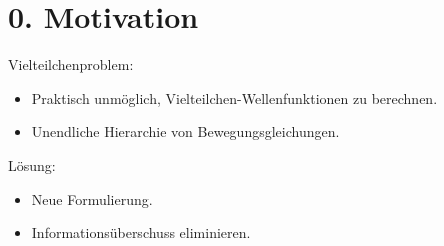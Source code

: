 \section*{0. Motivation}

Vielteilchenproblem:
\begin{itemize}
    \item Praktisch unmöglich, Vielteilchen-Wellenfunktionen zu berechnen.
    \item Unendliche Hierarchie von Bewegungsgleichungen.
\end{itemize}

Lösung:
\begin{itemize}
    \item Neue Formulierung.
    \item Informationsüberschuss eliminieren.
\end{itemize}
